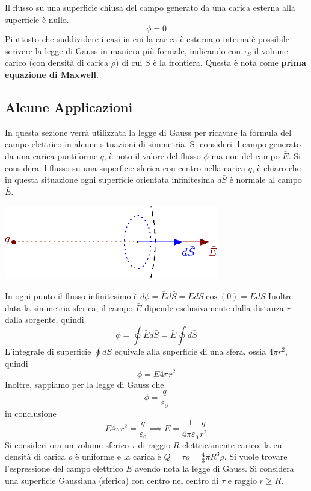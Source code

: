 \documentclass[10pt, letterpaper]{report}
\begin{document}
Il flusso su una superficie chiusa del campo generato da una carica esterna alla superficie è nullo. 
$$ \phi = 0$$
Piuttosto che suddividere i casi in cui la carica è esterna o interna è possibile scrivere la legge di Gauss in maniera più formale, indicando con $\tau_S$ il volume carico (con densità di carica $\rho$) di cui $S$ è la frontiera. 
Questa è nota come \textbf{prima equazione di Maxwell}.
\subsection{Alcune Applicazioni}
In questa sezione verrà utilizzata la legge di Gauss per ricavare la formula del campo elettrico in alcune situazioni di simmetria.\acc 
Si consideri il campo generato da una carica puntiforme $q$, è noto il valore del flusso $\phi$ ma non del campo $\bar E$. Si considera il flusso su una superficie sferica con centro nella carica $q$, è chiaro che in questa situazione ogni superficie orientata infinitesima $d\bar S$ è normale al campo $\bar E$.\begin{center}
    \includegraphics[width=0.7\textwidth]{images/GaussEx1.eps}
\end{center}
In ogni punto il flusso infinitesimo è $d\phi=\bar Ed\bar S = EdS\cos(0)=EdS$
Inoltre data la simmetria sferica, il campo $\bar E$ dipende esclusivamente dalla distanza $r$ dalla sorgente, quindi 
$$\phi=\oint \bar Ed\bar S =\bar E\oint d\bar S $$
L'integrale di superficie $\oint d\bar S $ equivale alla superficie di una sfera, ossia $4\pi r^2$, quindi 
$$ \phi = E4\pi r^2$$
Inoltre, sappiamo per la legge di Gauss che 
$$ \phi = \frac{q}{\varepsilon_0}$$
in conclusione
$$
    E4\pi r^2= \frac{q}{\varepsilon_0}\implies E = \frac{1}{4\pi\varepsilon_0}\frac{q}{ r^2}
$$
Si consideri ora un volume sferico $\tau$ di raggio $R$ elettricamente carico, la cui densità di carica $\rho$ è uniforme e la carica è $Q=\tau\rho=\frac{4}{3}\pi R^3 \rho$. Si vuole trovare l'espressione del campo elettrico $E$ avendo nota la legge di Gauss. Si considera una superficie Gaussiana (sferica) con centro nel centro di $\tau$ e raggio $r\ge R$.
\end{document}
